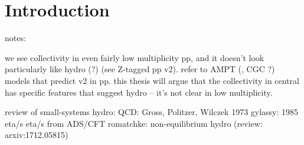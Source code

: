 \chapter{Introduction}
\label{ch:intro}

 notes:

 we see collectivity in even fairly low multiplicity pp, and it doesn't look particularly like hydro (?) (see Z-tagged pp v2). refer to AMPT (, CGC ?) models that predict v2 in pp. this thesis will argue that the collectivity in central \pPb has specific features that suggest hydro -- it's not clear in low multiplicity.

 review of small-systems hydro: \cite{Nagle:2018nvi}
 QCD: Gross, Politzer, Wilczek 1973 \cite{Gross:1973ju} 
 gylassy: 1985 eta/s \cite{Danielewicz:1984ww}
 eta/s from ADS/CFT \cite{Kovtun:2004de}
 romatchke: non-equilibrium hydro \cite{Romatschke:2016hle,Romatschke:2017vte} (review: arxiv:1712.05815)
